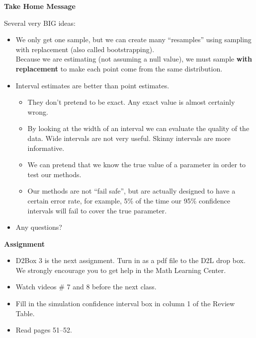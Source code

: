 \begin{center}
  {\large \bf Take Home Message} 
\end{center}

Several very BIG ideas:\vspace{-.8cm}
\begin{itemize}
\item We only get one sample, but we can create many ``resamples''
  using sampling with replacement (also called bootstrapping).\\
  Because we are estimating (not assuming a null value), we must
  sample {\bf with replacement} to make each point come from the same
  distribution.  

\item Interval estimates are better than point estimates.
  \begin{itemize}
  \item They don't pretend to be exact. Any exact value is almost
    certainly wrong.
  \item By looking at the width of an interval we can evaluate the
    quality of the data.  Wide intervals are not very useful.  Skinny
    intervals are more informative.
  \item We can pretend that we know the true value of a parameter in
    order to test our methods.
  \item Our methods are not ``fail safe'', but are actually designed
    to have a certain error rate, for example, 5\% of the time our
    95\% confidence intervals will fail to cover the true parameter.
  \end{itemize}
 \item 
  Any questions? \vfill
\end{itemize}


\noindent
{\bf Assignment}
\begin{itemize}
\item D2Box 3 is the next assignment. Turn in as a pdf file to the D2L drop box.
  We strongly encourage you to get help in the Math Learning Center.
 \item Watch videos  \# 7 and 8  before the next class.
\item Fill in the simulation confidence interval box in column 1 of
  the Review Table.

\item Read  pages 51--52.
\end{itemize}






